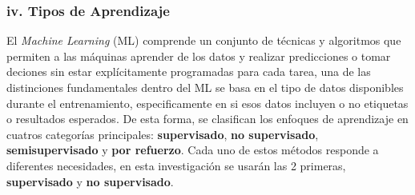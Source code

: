 \documentclass[11pt]{article} %
\begin{document}
\subsubsection{iv. Tipos de Aprendizaje}
El \textit{Machine Learning} (ML) comprende un conjunto de técnicas y algoritmos que permiten a las máquinas aprender de los datos y realizar predicciones o tomar deciones sin estar explícitamente programadas para cada tarea, una de las distinciones fundamentales dentro del ML se basa en el tipo de datos disponibles durante el entrenamiento, especificamente en si esos datos incluyen o no etiquetas o resultados esperados. De esta forma, se clasifican los enfoques de aprendizaje en cuatros categorías principales: \textbf{supervisado}, \textbf{no supervisado}, \textbf{semisupervisado} y \textbf{por refuerzo}. Cada uno de estos métodos responde a diferentes necesidades, en esta investigación se usarán las 2 primeras, \textbf{supervisado} y \textbf{no supervisado}.
\end{document}
